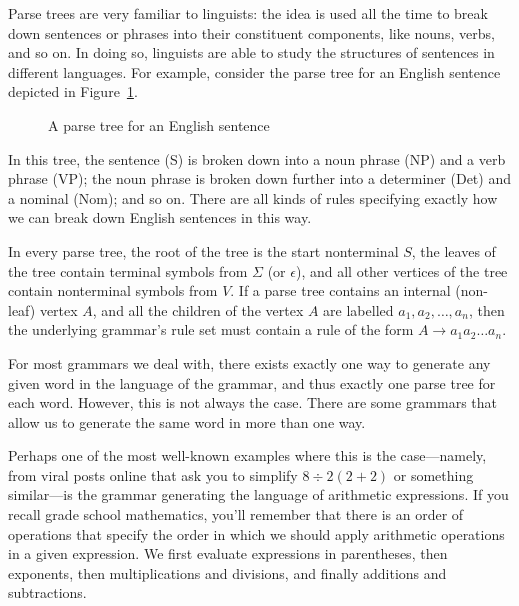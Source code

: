 Parse trees are very familiar to linguists: the idea is used all the time to break down sentences or phrases into their constituent components, like nouns, verbs, and so on. In doing so, linguists are able to study the structures of sentences in different languages. For example, consider the parse tree for an English sentence depicted in Figure~\ref{fig:parsetree}.
\begin{figure}
\centering
{}
\caption{A parse tree for an English sentence}
\label{fig:parsetree}
\end{figure}
In this tree, the sentence (S) is broken down into a noun phrase (NP) and a verb phrase (VP); the noun phrase is broken down further into a determiner (Det) and a nominal (Nom); and so on. There are all kinds of rules specifying exactly how we can break down English sentences in this way.

In every parse tree, the root of the tree is the start nonterminal $S$, the leaves of the tree contain terminal symbols from $\Sigma$ (or $\epsilon$), and all other vertices of the tree contain nonterminal symbols from $V$. If a parse tree contains an internal (non-leaf) vertex $A$, and all the children of the vertex $A$ are labelled $a_{1}, a_{2}, \dots, a_{n}$, then the underlying grammar's rule set must contain a rule of the form $A \rightarrow a_{1}a_{2} \dots a_{n}$.

For most grammars we deal with, there exists exactly one way to generate any given word in the language of the grammar, and thus exactly one parse tree for each word. However, this is not always the case. There are some grammars that allow us to generate the same word in more than one way.

Perhaps one of the most well-known examples where this is the case---namely, from viral posts online that ask you to simplify $8 \div 2 (2 + 2)$ or something similar---is the grammar generating the language of arithmetic expressions. If you recall grade school mathematics, you'll remember that there is an order of operations that specify the order in which we should apply arithmetic operations in a given expression. We first evaluate expressions in parentheses, then exponents, then multiplications and divisions, and finally additions and subtractions.

